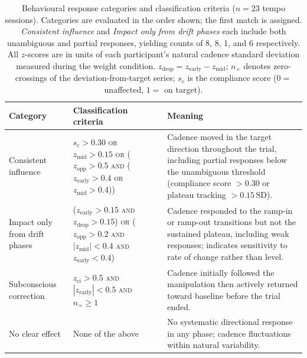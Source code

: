 %

\begin{table}[htbp]
\centering
\small
\setlength{\tabcolsep}{6pt}
\renewcommand{\arraystretch}{1.5}
\begin{tabular}{@{} l p{5.6cm} p{4.8cm} @{}}
\toprule
\textbf{Category} & \textbf{Classification criteria} & \textbf{Meaning} \\
\midrule

Consistent influence
  & $s_c > 0.30$
    \;\textsc{or}\; $z_\mathrm{mid} > 0.15$
    \;\textsc{or}\; ($z_\mathrm{opp} > 0.5$ \;\textsc{and}\;
    ($z_\mathrm{early} > 0.4$ \;\textsc{or}\; $z_\mathrm{mid} > 0.4$))
  & Cadence moved in the target direction throughout the trial,
    including partial responses below the unambiguous threshold
    (compliance score $> 0.30$ or plateau tracking $> 0.15\,\text{SD}$). \\

Impact only from drift phases
  & ($z_\mathrm{early} > 0.15$ \;\textsc{and}\; $z_\mathrm{drop} > 0.15$)
    \;\textsc{or}\;
    ($z_\mathrm{opp} > 0.2$ \;\textsc{and}\; $|z_\mathrm{mid}| < 0.4$
    \;\textsc{and}\; $z_\mathrm{early} < 0.4$)
  & Cadence responded to the ramp-in or ramp-out transitions but not
    the sustained plateau, including weak responses;
    indicates sensitivity to rate of change rather than level. \\

Subconscious correction
  & $z_\mathrm{ci} > 0.5$ \;\textsc{and}\; $|z_\mathrm{early}| < 0.5$
    \;\textsc{and}\; $n_\times \geq 1$
  & Cadence initially followed the manipulation then actively returned
    toward baseline before the trial ended. \\

No clear effect
  & None of the above
  & No systematic directional response in any phase;
    cadence fluctuations within natural variability. \\

\bottomrule
\end{tabular}
\caption{Behavioural response categories and classification criteria
         ($n = 23$ tempo sessions).
         Categories are evaluated in the order shown; the first match is assigned.
         \textit{Consistent influence} and \textit{Impact only from drift phases}
         each include both unambiguous and partial responses, yielding counts of
         8, 8, 1, and 6 respectively.
         All $z$-scores are in units of each participant's natural cadence
         standard deviation measured during the weight condition.
         $z_\mathrm{drop} = z_\mathrm{early} - z_\mathrm{mid}$;
         $n_\times$ denotes zero-crossings of the deviation-from-target series;
         $s_c$ is the compliance score ($0 =$ unaffected, $1 =$ on target).}
\label{tab:profile-criteria}
\end{table}

